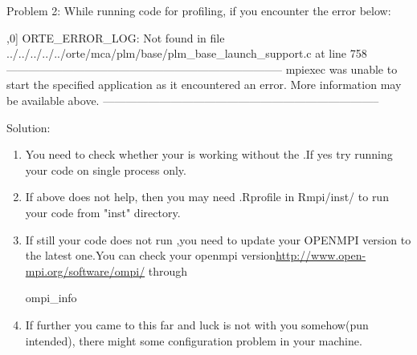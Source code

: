 {\color{red}Problem 2:}  While running  code for profiling, if you 
encounter the error below:
\begin{Output}
[G:12221] [[39704,0],0] ORTE_ERROR_LOG: Not found in file ../../../../../orte/mca/plm/base/plm_base_launch_support.c at line 758
--------------------------------------------------------------------------
mpiexec was unable to start the specified application as it encountered an error.
More information may be available above.
--------------------------------------------------------------------------
\end{Output}
{\color{dkgreen}Solution:}
\begin{enumerate}
\item You need to check whether your  is working without the .If yes try running your  code on single process only.
\item If above does not help, then you may need .Rprofile in Rmpi/inst/ to run your code from "inst" directory.
\item If still your code does not run ,you need to update your OPENMPI version to the latest one.You can check your openmpi version\url{http://www.open-mpi.org/software/ompi/} through 
\begin{Output}
ompi_info
\end{Output}
\item If further you came to this far and luck is not with you somehow(pun intended), there might some configuration problem in your machine.
\end{enumerate}



